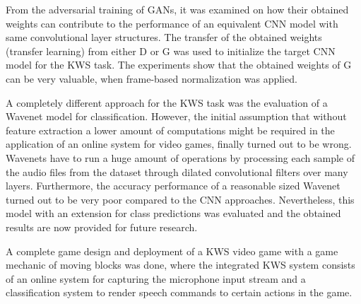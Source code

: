 From the adversarial training of GANs, it was examined on how their obtained weights can contribute to the performance of an equivalent CNN model with same convolutional layer structures.
The transfer of the obtained weights (transfer learning) from either D or G was used to initialize the target CNN model for the KWS task.
The experiments show that the obtained weights of G can be very valuable, when frame-based normalization was applied.

A completely different approach for the KWS task was the evaluation of a Wavenet \cite{Oord2016} model for classification.
However, the initial assumption that without feature extraction a lower amount of computations might be required in the application of an online system for video games, finally turned out to be wrong.
Wavenets have to run a huge amount of operations by processing each sample of the audio files from the dataset through dilated convolutional filters over many layers.
Furthermore, the accuracy performance of a reasonable sized Wavenet turned out to be very poor compared to the CNN approaches.
Nevertheless, this model with an extension for class predictions was evaluated and the obtained results are now provided for future research.

A complete game design and deployment of a KWS video game with a game mechanic of moving blocks was done, where the integrated KWS system consists of an online system for capturing the microphone input stream and a classification system to render speech commands to certain actions in the game.